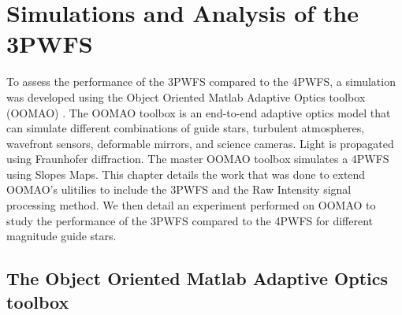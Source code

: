 \chapter{Simulations and Analysis of the 3PWFS}\label{CH4}

To assess the performance of the 3PWFS compared to the 4PWFS, a simulation was developed using the Object Oriented Matlab Adaptive Optics toolbox (OOMAO) \cite{OOMAO}. The OOMAO toolbox is an end-to-end adaptive optics model that can simulate different combinations of guide stars, turbulent atmospheres, wavefront sensors, deformable mirrors, and science cameras. Light is propagated using Fraunhofer diffraction. The master OOMAO toolbox simulates a 4PWFS using Slopes Maps. This chapter details the work that was done to extend OOMAO's ulitilies to include the 3PWFS and the Raw Intensity signal processing method. We then detail an experiment performed on OOMAO to study the performance of the 3PWFS compared to the 4PWFS for different magnitude guide stars. 

\section{The Object Oriented Matlab Adaptive Optics toolbox}

